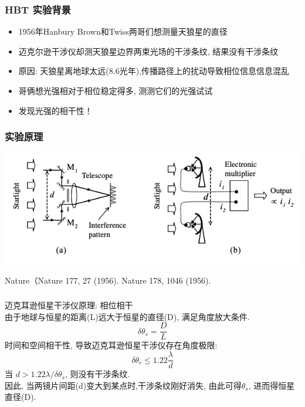 \begin{frame} 
\frametitle{HBT 实验背景}
\begin{itemize}
    \item 1956年Hanbury Brown和Twiss两哥们想测量天狼星的直径
    \item 迈克尔逊干涉仪却测天狼星边界两束光场的干涉条纹, 结果没有干涉条纹
    \item 原因: 天狼星离地球太远(8.6光年),传播路径上的扰动导致相位信息信息混乱
    \item 哥俩想光强相对于相位稳定得多, 测测它们的光强试试
    \item 发现光强的相干性！
\end{itemize}
\end{frame}

\begin{frame} 
 \frametitle{实验原理}
   \begin{center}
        \includegraphics[width=1.0\textwidth]{figs/2022-05-08-12-30-39.png}
   \end{center}
   Nature（Nature 177, 27 (1956). Nature 178, 1046 (1956). 
\end{frame}

\begin{frame}
 \frametitle{}
 迈克耳逊恒星干涉仪原理: 相位相干 \\ 
 由于地球与恒星的距离(L)远大于恒星的直径(D), 满足角度放大条件.
 \[ \delta \theta_s =\frac{D}{L}\] 
 时间和空间相干性, 导致迈克耳逊恒星干涉仪存在角度极限:
 \[ \delta \theta_r\leq 1.22 \frac{\lambda}{d}\] 
 当 $d> 1.22 \lambda /\delta \theta_s$, 则没有干涉条纹.  \\ \vspace*{1.3em}
 因此, 当两镜片间距(d)变大到某点时,干涉条纹刚好消失, 由此可得$\theta_s$, 进而得恒星直径(D). 
\end{frame}

